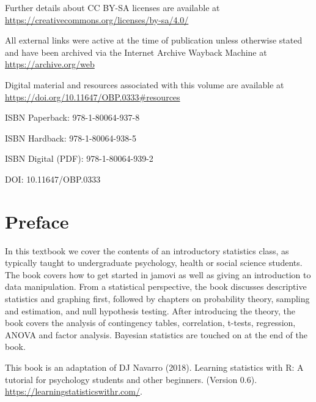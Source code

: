 \documentclass[
  a4paper,
]{book}
\renewcommand*\contentsname{Table of contents}
\newcommand\contentsname{Table of contents}
\begin{document}
Further details about CC BY-SA licenses are available at \\ \url{https://creativecommons.org/licenses/by-sa/4.0/}

All external links were active at the time of publication unless otherwise stated and have been archived via the Internet Archive Wayback Machine at \\ \url{https://archive.org/web}

Digital material and resources associated with this volume are available at \\ \url{https://doi.org/10.11647/OBP.0333\#resources}

ISBN Paperback: 978-1-80064-937-8

ISBN Hardback: 978-1-80064-938-5

ISBN Digital (PDF): 978-1-80064-939-2

DOI: 10.11647/OBP.0333


\vfill
\hspace{0pt}
\pagebreak


\renewcommand*\contentsname{Table of contents}
{
\hypersetup{linkcolor=}
\setcounter{tocdepth}{2}
\tableofcontents
}

\mainmatter
{}

\chapter*{Preface}\label{preface}


In this textbook we cover the contents of an introductory statistics
class, as typically taught to undergraduate psychology, health or social
science students. The book covers how to get started in jamovi as well
as giving an introduction to data manipulation. From a statistical
perspective, the book discusses descriptive statistics and graphing
first, followed by chapters on probability theory, sampling and
estimation, and null hypothesis testing. After introducing the theory,
the book covers the analysis of contingency tables, correlation,
t-tests, regression, ANOVA and factor analysis. Bayesian statistics are
touched on at the end of the book.

This book is an adaptation of DJ Navarro (2018). Learning statistics
with R: A tutorial for psychology students and other beginners. (Version
0.6). \url{https://learningstatisticswithr.com/}.
\end{document}
